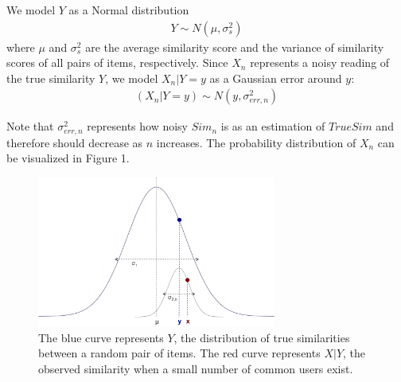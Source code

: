 \documentclass[11pt]{article}
\begin{document}
We model $Y$ as a Normal distribution 
\begin{align}
Y \sim N(\mu, \sigma_{s}^2)
\end{align}
where $\mu$ and $\sigma_{s}^2$ are the average similarity score and the variance 
of similarity scores of all pairs of items, respectively. Since $X_n$ represents
a noisy reading of the true similarity $Y$, we model $X_n | Y=y$ as a Gaussian
error around $y$:
\begin{align}
(X_n | Y=y) \sim N(y, \sigma_{err, n}^2)
\end{align}

Note that $\sigma_{err, n}^2$ represents how noisy $Sim_n$ is as an estimation of
$TrueSim$ and therefore should decrease as $n$ increases. The probability
distribution of $X_n$ can be visualized in Figure 1.

\begin{figure}[!htbp]
    \centering
    \includegraphics[width=0.7\textwidth]{twonormals.png}
	\caption{The blue curve represents $Y$, the distribution of true
    similarities between a random pair of items. The red curve represents $X|Y$,
    the observed similarity when a small number of common users exist.}
    \label{fig:two_normals}
\end{figure}
\end{document}
